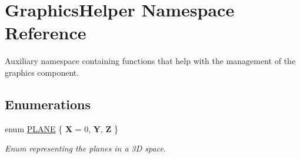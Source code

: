 \hypertarget{namespace_graphics_helper}{}\section{Graphics\+Helper Namespace Reference}
\label{namespace_graphics_helper}


Auxiliary namespace containing functions that help with the management of the graphics component.  


\subsection*{Enumerations}
\begin{DoxyCompactItemize}
\item 
enum \hyperlink{namespace_graphics_helper_abb17d8dd557f79c9ea251cdd14bf0fd3}{P\+L\+A\+NE} \{ {\bfseries X} = 0, 
{\bfseries Y}, 
{\bfseries Z}
 \}\begin{DoxyCompactList}\small\item\em Enum representing the planes in a 3D space. \end{DoxyCompactList}
\end{DoxyCompactItemize}
